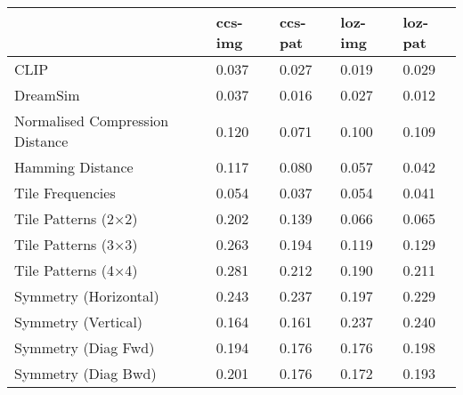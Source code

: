 \begin{table}[]
\begin{tabular}{l|llll}
                                & ccs-img & ccs-pat & loz-img & loz-pat  \\ \hline
CLIP                            & 0.037   & 0.027   & 0.019   & 0.029    \\
DreamSim                        & 0.037   & 0.016   & 0.027   & 0.012    \\
Normalised Compression Distance & 0.120   & 0.071   & 0.100   & 0.109    \\
Hamming Distance                & 0.117   & 0.080   & 0.057   & 0.042    \\
Tile Frequencies                & 0.054   & 0.037   & 0.054   & 0.041    \\
Tile Patterns (2×2)             & 0.202   & 0.139   & 0.066   & 0.065    \\
Tile Patterns (3×3)             & 0.263   & 0.194   & 0.119   & 0.129    \\
Tile Patterns (4×4)             & 0.281   & 0.212   & 0.190   & 0.211    \\
Symmetry (Horizontal)           & 0.243   & 0.237   & 0.197   & 0.229    \\
Symmetry (Vertical)             & 0.164   & 0.161   & 0.237   & 0.240    \\
Symmetry (Diag Fwd)             & 0.194   & 0.176   & 0.176   & 0.198    \\
Symmetry (Diag Bwd)             & 0.201   & 0.176   & 0.172   & 0.193    \\
\hline
\end{tabular}
\end{table}
